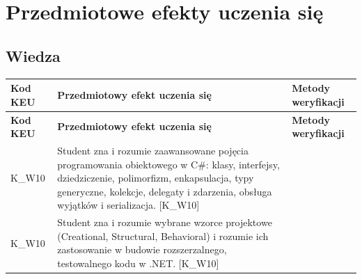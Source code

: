 \documentclass[12pt, a4paper]{article}
\newcommand{\thdrule}{\noalign{\global\setlength{\extrarowheight}{0pt}}}
\newcommand{\thdend}{\noalign{\global\setlength{\extrarowheight}{3pt}}}
\begin{document}
\section{Przedmiotowe efekty uczenia się}

\subsection*{Wiedza}
{\scriptsize
\begin{longtable}{m{1.6cm}m{9.0cm}m{4.2cm}}
\thdrule\toprule
\rowcolor{pjatkRed} {\color{white}\footnotesize\textbf{\vphantom{Ag}Kod KEU}} & {\color{white}\footnotesize\textbf{\vphantom{Ag}Przedmiotowy efekt uczenia się}} & {\color{white}\footnotesize\textbf{\vphantom{Ag}Metody weryfikacji}} \\
\midrule\thdend
\endfirsthead
\thdrule\toprule
\rowcolor{pjatkRed} {\color{white}\footnotesize\textbf{\vphantom{Ag}Kod KEU}} & {\color{white}\footnotesize\textbf{\vphantom{Ag}Przedmiotowy efekt uczenia się}} & {\color{white}\footnotesize\textbf{\vphantom{Ag}Metody weryfikacji}} \\
\midrule\thdend
\endhead
  \rowcolor{tableRowLight} K\_W10 & Student zna i rozumie zaawansowane pojęcia programowania obiektowego w C\#: klasy, interfejsy, dziedziczenie, polimorfizm, enkapsulacja, typy generyczne, kolekcje, delegaty i zdarzenia, obsługa wyjątków i serializacja. {[}K\_W10{]} &  \\
  \rowcolor{tableRowAlt} K\_W10 & Student zna i rozumie wybrane wzorce projektowe (Creational, Structural, Behavioral) i rozumie ich zastosowanie w budowie rozszerzalnego, testowalnego kodu w .NET. {[}K\_W10{]} &  \\
\bottomrule
\end{longtable}}
\end{document}
